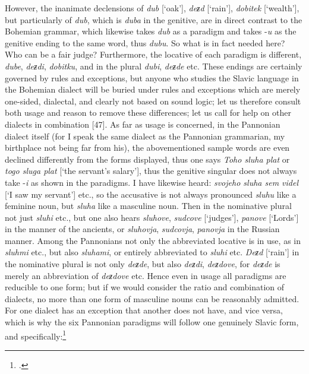 However, the inanimate declensions of \textit{dub} [‘oak’], \textit{deƶd} [‘rain’], \textit{dobitek} \linebreak{}[‘wealth’], but particularly of \textit{dub}, which is \textit{duba} in the genitive, are in direct contrast to the Bohemian grammar, which likewise takes \textit{dub} as a paradigm and takes -\textit{u} as the genitive ending to the same word, thus \textit{dubu}. So what is in fact needed here? Who can be a fair judge? Furthermore, the locative of each paradigm is different, \textit{dube}, \textit{deƶdi}, \textit{dobitku}, and in the plural \textit{dubi}, \textit{deƶde} etc. These endings are certainly governed by rules and exceptions, but anyone who studies the Slavic language in the Bohemian dialect will be buried under rules and exceptions which are merely one-sided, dialectal, and clearly not based on sound logic; let us therefore consult both usage and reason to remove these differences; let us call for help on other dialects in combination [47]. As far as usage is concerned, in the Pannonian dialect itself (for I speak the same dialect as the Pannonian grammarian, my birthplace not being far from his), the abovementioned sample words are even declined differently from the forms displayed, thus one says \textit{Toho sluha plat} or \textit{togo sluga plat} [‘the servant’s salary’], thus the genitive singular does not always take -\textit{i} as shown in the paradigms. I have likewise heard: \textit{svojeho sluha sem videl} [‘I saw my servant’] etc., so the accusative is not always pronounced \textit{sluhu} like a feminine noun, but \textit{sluha} like a masculine noun. Then in the nominative plural not just \textit{sluhi} etc., but one also hears \textit{sluhove}, \textit{sudcove} [‘judges’], \textit{panove} [‘Lords’] in the manner of the ancients, or \textit{sluhovja}, \textit{sudcovja}, \textit{panovja} in the Russian manner. Among the Pannonians not only the abbreviated locative is in use, as in \textit{sluhmi} etc., but also \textit{sluhami}, or entirely abbreviated to \textit{sluhi} etc. \textit{Deƶd} [‘rain’] in the nominative plural is not only \textit{deƶde}, but also \textit{deƶdi}, \textit{deƶdove}, for \textit{deƶde} is merely an abbreviation of \textit{deƶdove} etc. Hence even in usage all paradigms are reducible to one form; but if we would consider the ratio and combination of dialects, no more than one form of masculine nouns can be reasonably admitted. For one dialect has an exception that another does not have, and vice versa, which is why the six Pannonian paradigms will follow one genuinely Slavic form, and specifically:{\enlargethispage{2mm}\footnote{\citet[27--28]{bernolak_grammatica_1790}.}}


